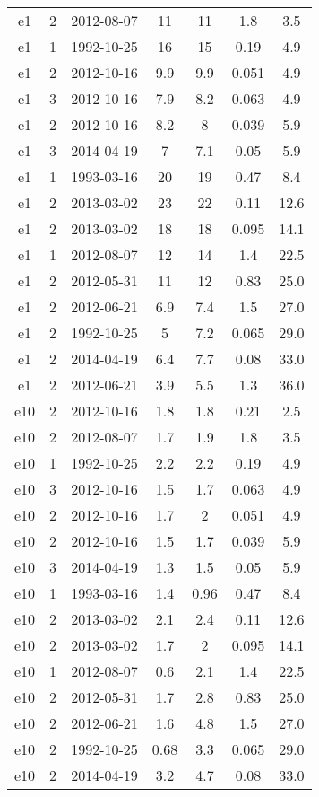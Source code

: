 \begin{table*}[htp]
\begin{tabular}{ccccccc}
e1 & 2 & 2012-08-07 & 11 & 11 & 1.8 & 3.5 \\
e1 & 1 & 1992-10-25 & 16 & 15 & 0.19 & 4.9 \\
e1 & 2 & 2012-10-16 & 9.9 & 9.9 & 0.051 & 4.9 \\
e1 & 3 & 2012-10-16 & 7.9 & 8.2 & 0.063 & 4.9 \\
e1 & 2 & 2012-10-16 & 8.2 & 8 & 0.039 & 5.9 \\
e1 & 3 & 2014-04-19 & 7 & 7.1 & 0.05 & 5.9 \\
e1 & 1 & 1993-03-16 & 20 & 19 & 0.47 & 8.4 \\
e1 & 2 & 2013-03-02 & 23 & 22 & 0.11 & 12.6 \\
e1 & 2 & 2013-03-02 & 18 & 18 & 0.095 & 14.1 \\
e1 & 1 & 2012-08-07 & 12 & 14 & 1.4 & 22.5 \\
e1 & 2 & 2012-05-31 & 11 & 12 & 0.83 & 25.0 \\
e1 & 2 & 2012-06-21 & 6.9 & 7.4 & 1.5 & 27.0 \\
e1 & 2 & 1992-10-25 & 5 & 7.2 & 0.065 & 29.0 \\
e1 & 2 & 2014-04-19 & 6.4 & 7.7 & 0.08 & 33.0 \\
e1 & 2 & 2012-06-21 & 3.9 & 5.5 & 1.3 & 36.0 \\
e10 & 2 & 2012-10-16 & 1.8 & 1.8 & 0.21 & 2.5 \\
e10 & 2 & 2012-08-07 & 1.7 & 1.9 & 1.8 & 3.5 \\
e10 & 1 & 1992-10-25 & 2.2 & 2.2 & 0.19 & 4.9 \\
e10 & 3 & 2012-10-16 & 1.5 & 1.7 & 0.063 & 4.9 \\
e10 & 2 & 2012-10-16 & 1.7 & 2 & 0.051 & 4.9 \\
e10 & 2 & 2012-10-16 & 1.5 & 1.7 & 0.039 & 5.9 \\
e10 & 3 & 2014-04-19 & 1.3 & 1.5 & 0.05 & 5.9 \\
e10 & 1 & 1993-03-16 & 1.4 & 0.96 & 0.47 & 8.4 \\
e10 & 2 & 2013-03-02 & 2.1 & 2.4 & 0.11 & 12.6 \\
e10 & 2 & 2013-03-02 & 1.7 & 2 & 0.095 & 14.1 \\
e10 & 1 & 2012-08-07 & 0.6 & 2.1 & 1.4 & 22.5 \\
e10 & 2 & 2012-05-31 & 1.7 & 2.8 & 0.83 & 25.0 \\
e10 & 2 & 2012-06-21 & 1.6 & 4.8 & 1.5 & 27.0 \\
e10 & 2 & 1992-10-25 & 0.68 & 3.3 & 0.065 & 29.0 \\
e10 & 2 & 2014-04-19 & 3.2 & 4.7 & 0.08 & 33.0 \\

\end{tabular}
\end{table*}
